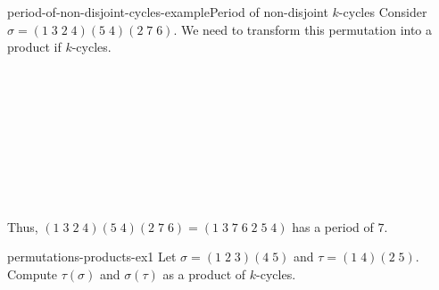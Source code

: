 \documentclass[preview]{standalone}
\begin{document}
\begin{snippetexample}{period-of-non-disjoint-cycles-example}{Period of non-disjoint \(k\)-cycles}
    Consider \(\sigma = (1 \; 3 \; 2 \; 4)(5 \; 4)(2 \; 7 \; 6)\).
    We need to transform this permutation into a product if \disjointperm \(k\)-cycles.
    \begin{center}
    \end{center}
    \begin{center}
        \\
        \\
        \\
        \\
        \\
    \end{center}
    Thus, \((1 \; 3 \; 2 \; 4)(5\;4)(2\;7\;6) = (1\;3\;7\;6\;2\;5\;4)\)
    has a period of \(7\).
\end{snippetexample}

\begin{snippetexercise}{permutations-products-ex1}{}
    Let \(\sigma = (1\;2\;3)(4\;5)\)
    and \(\tau = (1\;4)(2\;5)\). Compute \(\tau(\sigma)\)
    and \(\sigma(\tau)\)
    as a product of \disjointperm \(k\)-cycles.
\end{snippetexercise}
\end{document}
